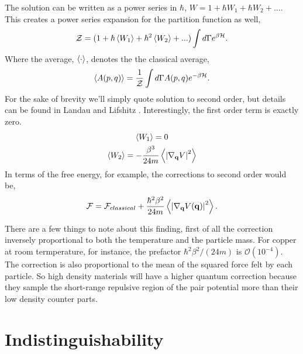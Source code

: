 %
The solution can be written as a power series in $\hbar$, $W = 1 + \hbar W_1 + \hbar W_2 + ...$.
This creates a power series expansion for the partition function as well,
%
\begin{equation}
    \mathcal{Z} = (1 + \hbar \left\langle W_1 \right\rangle + \hbar^2 \left\langle W_2 \right\rangle+ ...) 
    \int d\Gamma e^{\beta\mathcal{H}}.
\end{equation}
%
Where the average, $\left\langle \cdot \right\rangle$, denotes the the classical average, 
%
\begin{equation}
    \langle A(p, q) \rangle = \frac{1}{\mathcal{Z}} 
        \int d\Gamma A(p, q) e^{-\beta \mathcal{H}}.
\end{equation}
%
For the sake of brevity we'll simply quote solution to second order, but details can be found in Landau and Lifshitz \cite{LANDAU198079}.
Interestingly, the first order term is exactly zero.
%
\begin{gather}
    \left\langle W_1 \right\rangle= 0 \\
    \left\langle W_2 \right\rangle = - \frac{\beta^3}{24 m} \left\langle \left\vert \nabla_{\mathbf{q}} V \right\vert^2 \right\rangle 
\end{gather}
%
In terms of the free energy, for example, the corrections to second order would be, 
%
\begin{equation}{\label{quantumcorr}}
    \mathcal{F} = \mathcal{F}_{classical} + \frac{\hbar^2\beta^2}{24m}
        \left\langle  \left\vert \nabla_{\mathbf{q}} V(\mathbf{q}) \right\vert^2  \right\rangle.
\end{equation}

There are a few things to note about this finding, first of all the correction inversely proportional to both the temperature and the particle mass.
For copper at room termperature, for instance, the prefactor $\hbar^2\beta^2/(24 m)$ is $\mathcal{O}(10^{-4})$. 
The correction is also proportional to the mean of the squared force felt by each particle. So high density materials will have a higher quantum correction because they sample the short-range repulsive region of the pair potential more than their low density counter parts.

\section{Indistinguishability} %

